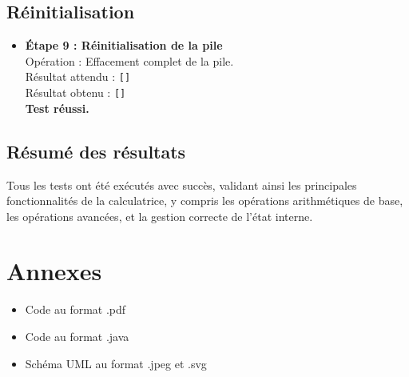 \documentclass[12pt, a4paper, onecolumn]{article}
\begin{document}
\subsection{Réinitialisation}
\begin{itemize}
	\item \textbf{Étape 9 : Réinitialisation de la pile} \\
	Opération : Effacement complet de la pile. \\
	Résultat attendu : \texttt{[]} \\
	Résultat obtenu : \texttt{[]} \\
	\textbf{Test réussi.}
\end{itemize}

\subsection{Résumé des résultats}
Tous les tests ont été exécutés avec succès, validant ainsi les principales fonctionnalités de la calculatrice, y compris les opérations arithmétiques de base, les opérations avancées, et la gestion correcte de l'état interne.

\section{Annexes}
\begin{itemize}
	\item Code au format .pdf
	\item Code au format .java
	\item Schéma UML au format .jpeg et .svg
\end{itemize}
\end{document}
